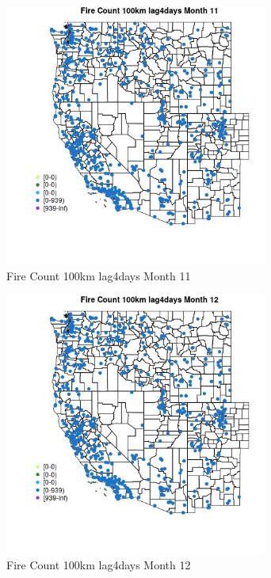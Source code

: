 \begin{figure} 
\centering  
\includegraphics[width=0.77\textwidth]{Code_Outputs/Report_ML_input_PM25_Step4_part_e_de_duplicated_aves_compiled_2019-05-21wNAs_MapObsMo11Fire_Count_100km_lag4days.jpg} 
\caption{\label{fig:Report_ML_input_PM25_Step4_part_e_de_duplicated_aves_compiled_2019-05-21wNAsMapObsMo11Fire_Count_100km_lag4days}Fire Count 100km lag4days Month 11} 
\end{figure} 
 

\clearpage 

\begin{figure} 
\centering  
\includegraphics[width=0.77\textwidth]{Code_Outputs/Report_ML_input_PM25_Step4_part_e_de_duplicated_aves_compiled_2019-05-21wNAs_MapObsMo12Fire_Count_100km_lag4days.jpg} 
\caption{\label{fig:Report_ML_input_PM25_Step4_part_e_de_duplicated_aves_compiled_2019-05-21wNAsMapObsMo12Fire_Count_100km_lag4days}Fire Count 100km lag4days Month 12} 
\end{figure} 
 

